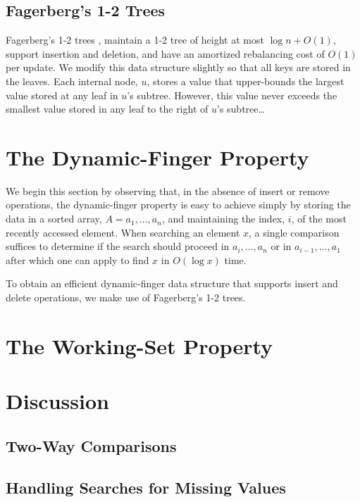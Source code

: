 \documentclass{patmorin}
\begin{document}
\subsection{Fagerberg's 1-2 Trees}

Fagerberg's 1-2 trees \cite{fagerberg:complexity}, maintain a 1-2 tree
of height at most $\log n +O(1)$, support insertion and deletion, and
have an amortized rebalancing cost of $O(1)$ per update.  We modify this
data structure slightly so that all keys are stored in the leaves. Each
internal node, $u$, stores a value that upper-bounds the largest value
stored at any leaf in $u$'s subtree. However, this value never exceeds the
smallest value stored in any leaf to the right of $u$'s subtree\ldots




\section{The Dynamic-Finger Property}

We begin this section by observing that, in the absence of insert or
remove operations, the dynamic-finger property is easy to achieve simply
by storing the data in a sorted array, $A=a_1,\ldots,a_n$, and maintaining
the index, $i$, of the most recently accessed element.  When searching
an element $x$, a single comparison suffices to determine if the search
should proceed in $a_i,\ldots, a_n$ or in $a_{i-1},\ldots,a_1$ after which
one can apply  to find $x$ in $O(\log x)$ time.

To obtain an efficient dynamic-finger data structure that supports insert
and delete operations, we make use of Fagerberg's 1-2 trees.




\section{The Working-Set Property}

\section{Discussion}

\subsection{Two-Way Comparisons}

\subsection{Handling Searches for Missing Values}
\end{document}
